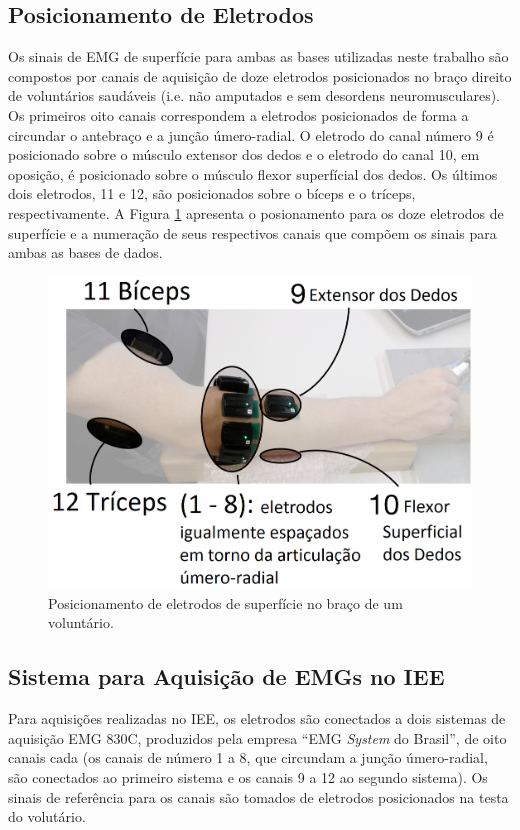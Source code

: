 			\subsection{Posicionamento de Eletrodos}
Os sinais de EMG de superfície para ambas as bases utilizadas neste trabalho são compostos por canais de aquisição de doze eletrodos posicionados no braço direito de voluntários saudáveis (i.e. não amputados e sem desordens neuromusculares). Os primeiros oito canais correspondem a eletrodos posicionados de forma a circundar o antebraço e a junção úmero-radial. O eletrodo do canal número 9 é posicionado sobre o músculo extensor dos dedos e o eletrodo do canal 10, em oposição, é posicionado sobre o músculo flexor superfícial dos dedos. Os últimos dois eletrodos, 11 e 12, são posicionados sobre o bíceps e o tríceps, respectivamente. A Figura \ref{fig:eletrodos} apresenta o posionamento para os doze eletrodos de superfície e a numeração de seus respectivos canais que compõem os sinais para ambas as bases de dados.

\begin{figure}[htb]
	\caption{\label{fig:eletrodos}Posicionamento de eletrodos de superfície no braço de um voluntário.}
	\begin{center}
	    \includegraphics[width=0.75\linewidth]{./img/eletrodos.png}
	\end{center}
\end{figure}

			\subsection{Sistema para Aquisição de EMGs no IEE}
Para aquisições realizadas no IEE, os eletrodos são conectados a dois sistemas de aquisição EMG 830C, produzidos pela empresa ``EMG \emph{System} do Brasil'', de oito canais cada (os canais de número 1 a 8, que circundam a junção úmero-radial, são conectados ao primeiro sistema e os canais 9 a 12 ao segundo sistema). Os sinais de referência para os canais são tomados de eletrodos posicionados na testa do volutário.

